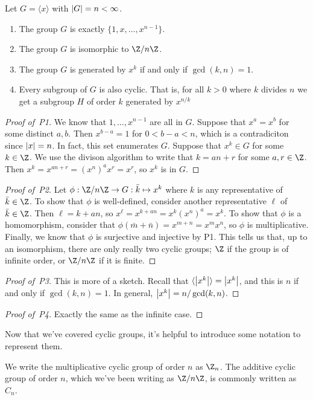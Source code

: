 \begin{proposition}
 Let $G = \langle x \rangle$ with $\abs{G} = n < \infty$.
 \begin{enumerate}[label=P\arabic*.]
 \item The group $G$ is exactly $\{1,x,\dotsc,x^{n-1}\}$.
 \item The group $G$ is isomorphic to $\Z/n\Z$.
 \item The group $G$ is generated by $x^k$ if and only if $\gcd(k,n) = 1$.
 \item Every subgroup of $G$ is also cyclic. That is, for all $k > 0$ where $k$ divides $n$ we get a subgroup $H$ of order $k$ generated by $x^{n/k}$
 \end{enumerate}
\end{proposition}
\begin{proof}[Proof of~P1]
We know that $1,\dotsc,x^{n-1}$ are all in $G$. Suppose that $x^a = x^b$ for some distinct $a,b$. Then $x^{b-a} = 1$ for $0 < b-a < n$, which is a contradiciton since $\abs{x} = n$. In fact, this set enumerates $G$. Suppose that $x^k \in G$ for some $k \in \Z$. We use the divison algorithm to write that $k = an + r$ for some $a,r \in \Z$. Then $x^k = x^{an+r} = (x^n)^ax^r = x^r$, so $x^k$ is in $G$.
\end{proof}
\begin{proof}[Proof of~P2]
Let $\phi : \Z/n\Z \to G : \bar{k} \mapsto x^k$ where $k$ is any representative of $\bar{k} \in \Z$. To show that $\phi$ is well-defined, consider another representative $\ell$ of $\bar{k} \in \Z$. Then $\ell = k + an$, so $x^\ell = x^{k+an} = x^k(x^n)^a = x^k$. To show that $\phi$ is a homomorphism, consider that $\phi(\bar{m}+\bar{n}) = x^{m+n} = x^{m}x^n$, so $\phi$ is multiplicative. Finally, we know that $\phi$ is surjective and injective by P1. This tells us that, up to an isomorphism, there are only really two cyclic groups; $\Z$ if the group is of infinite order, or $\Z/n\Z$ if it is finite.
\end{proof}
\begin{proof}[Proof of~P3]
This is more of a sketch. Recall that $\langle \abs{x^k}\rangle = \abs{x^k}$, and this is $n$ if and only if $\gcd(k,n) = 1$. In general, $\abs{x^k} = n / \gcd(k,n)$.
\end{proof}
\begin{proof}[Proof of~P4]
Exactly the same as the infinite case.
\end{proof}

Now that we've covered cyclic groups, it's helpful to introduce some notation to represent them.
\begin{notation}[$\Z_n, C_n$]
We write the multiplicative cyclic group of order $n$ as $\Z_n$. The additive cyclic group of order $n$, which we've been writing as $\Z/n\Z$, is commonly written as $C_n$.
\end{notation}

